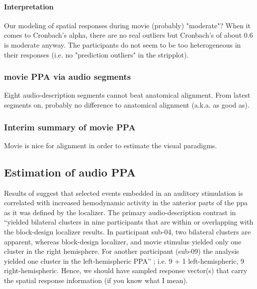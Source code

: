 \paragraph{Interpretation}
%
Our modeling of spatial responses during movie (probably) "moderate"?
%
When it comes to Cronbach's alpha, there are no real outliers but Cronbach's of
about 0.6 is moderate anyway.
%
The participants do not seem to be too heterogeneous in their responses (i.e.
no "prediction outliers" in the stripplot).



\subsubsection{movie PPA via audio segments}


%
Eight audio-description segments cannot beat anatomical alignment.
%
From latest segments on, probably no difference to anatomical alignment (a.k.a.
as good as).


\subsubsection{Interim summary of movie PPA}

Movie is nice for alignment in order to estimate the visual paradigms.



\subsection{Estimation of audio PPA}


%
Results of \citet{haeusler2022processing} suggest that selected events embedded
in an auditory stimulation is correlated with increased hemodynamic activity in
the anterior parts of the \ac{ppa} as it was defined by the localizer.
%
The primary audio-description contrast in \citet{haeusler2022processing}
``yielded bilateral clusters in nine participants that are within or overlapping
with the block-design localizer results. In participant sub-04, two bilateral
clusters are apparent, whereas block-design localizer, and movie stimulus
yielded only one cluster in the right hemisphere.  For another participant
(sub-09) the analysis yielded one cluster in the left-hemispheric PPA''
\citep{haeusler2022processing};
i.e. 9 + 1 left-hemispheric, 9 right-hemispheric.
%
Hence, we should have sampled response vector(s) that carry the spatial response
information (if you know what I mean).



